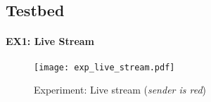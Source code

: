 \subsection{Testbed} %
\label{sub:Testbed_Implementation}

\paragraph{EX1: Live Stream} %
\label{par:impl EX1: Live Stream}

\begin{figure}[!htbp]
    \begin{center}
        \texttt{[image: exp\_live\_stream.pdf]}
    \end{center}
    \caption{Experiment: Live stream (\textit{sender is red})}
    \label{fig:exp_live_stream}
\end{figure}

